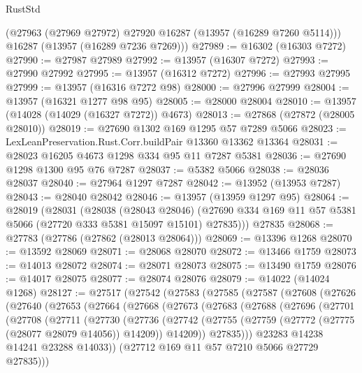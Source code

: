 \begin{lexlean}{RustStd}
\begin{coremodule}
      (@27963 (@27969 @27972) @27920 @16287 (@13957 (@16289 @7260 @5114)))
      @16287
      (@13957 (@16289 @7236 @7269)))
@27989 := @16302 (@16303 @7272)
@27990 := @27987 @27989
@27992 := @13957 (@16307 @7272)
@27993 := @27990 @27992
@27995 := @13957 (@16312 @7272)
@27996 := @27993 @27995
@27999 := @13957 (@16316 @7272 @98)
@28000 := @27996 @27999
@28004 := @13957 (@16321 @1277 @98 @95)
@28005 := @28000 @28004
@28010 := @13957 (@14028 (@14029 (@16327 @7272)) @4673)
@28013 := @27868 (@27872 (@28005 @28010))
@28019 := @27690 @1302 @169 @1295 @57 @7289 @5066
@28023 := LexLeanPreservation.Rust.Corr.buildPair @13360 @13362 @13364
@28031 := @28023 @16205 @4673 @1298 @334 @95 @11 @7287 @5381
@28036 := @27690 @1298 @1300 @95 @76 @7287
@28037 := @5382 @5066
@28038 := @28036 @28037
@28040 := @27964 @1297 @7287
@28042 := @13952 (@13953 @7287)
@28043 := @28040 @28042
@28046 := @13957 (@13959 @1297 @95)
@28064 := @28019
    (@28031
      (@28038
        (@28043 @28046)
        (@27690 @334 @169 @11 @57 @5381 @5066 (@27720 @333 @5381 @15097 @15101) @27835)))
    @27835
@28068 := @27783 (@27786 (@27862 (@28013 @28064)))
@28069 := @13396 @1268
@28070 := @13592 @28069
@28071 := @28068 @28070
@28072 := @13466 @1759
@28073 := @14013 @28072
@28074 := @28071 @28073
@28075 := @13490 @1759
@28076 := @14017 @28075
@28077 := @28074 @28076
@28079 := @14022 (@14024 @1268)
@28127 := @27517
    (@27542
      (@27583
        (@27585
          (@27587
            (@27608
              (@27626
                (@27640
                  (@27653
                    (@27664
                      (@27668
                        (@27673
                          (@27683
                            (@27688
                              (@27696
                                (@27701
                                  (@27708
                                    (@27711
                                      (@27730
                                        (@27736
                                          (@27742
                                            (@27755
                                              (@27759
                                                (@27772 (@27775 (@28077 @28079 @14056)) @14209))
                                              @14209))
                                          @27835)))
                                    @23283
                                    @14238
                                    @14241
                                    @23288
                                    @14033))
                                (@27712 @169 @11 @57 @7210 @5066 @27729 @27835)))

\end{coremodule}
\end{lexlean}
